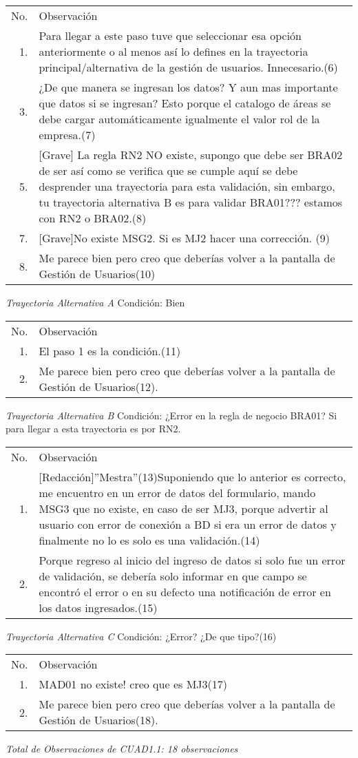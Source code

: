 \documentclass[10pt,spanish]{article}
\providecommand{\tabularnewline}{\\}
\begin{document}
\begin{longtable}{rp{8cm}}
No.  & Observación\tabularnewline
1.  & Para llegar a este paso tuve que seleccionar esa opción anteriormente o al menos así lo defines en la trayectoria principal/alternativa de la gestión de usuarios. Innecesario.(6)\tabularnewline
3.  & ¿De que manera se ingresan los datos? Y aun mas importante que datos si se ingresan? Esto porque el catalogo de áreas se debe cargar automáticamente igualmente el valor rol de la empresa.(7)\tabularnewline
5. & [Grave] La regla RN2 NO existe, supongo que debe ser BRA02 de ser así como se verifica que se cumple aquí se debe desprender una trayectoria para esta validación, sin embargo, tu trayectoria alternativa B es para validar BRA01??? estamos con RN2 o BRA02.(8)\tabularnewline
7. & [Grave]No existe MSG2. Si es MJ2 hacer una corrección. (9)\tabularnewline
8. & Me parece bien pero creo que deberías volver a la pantalla de Gestión de Usuarios(10)\tabularnewline

\end{longtable}

\textit{Trayectoria Alternativa A}
Condición: Bien
\begin{longtable}{rp{8cm}}
No.  & Observación\tabularnewline
1.  & El paso 1 es la condición.(11)\tabularnewline
2.  & Me parece bien pero creo que deberías volver a la pantalla de Gestión de Usuarios(12).\tabularnewline
\end{longtable}

\textit{Trayectoria Alternativa B}
Condición: ¿Error en la regla de negocio BRA01? Si para llegar a esta trayectoria es por RN2.
\begin{longtable}{rp{8cm}}
No.  & Observación\tabularnewline
1.  & [Redacción]''Mestra''(13)\newline
[Grave]Suponiendo que lo anterior es correcto, me encuentro en un error de datos del formulario, mando MSG3 que no existe, en caso de ser MJ3, porque advertir al usuario con error de conexión a BD si era un error de datos y finalmente no lo es solo es una validación.(14)
\tabularnewline
2.  & Porque regreso al inicio del ingreso de datos si solo fue un error de validación, se debería solo informar en que campo se encontró el error o en su defecto una notificación de error en los datos ingresados.(15)\tabularnewline
\end{longtable}

\textit{Trayectoria Alternativa C}
Condición: ¿Error? ¿De que tipo?(16)
\begin{longtable}{rp{8cm}}
No.  & Observación\tabularnewline
1.  & MAD01 no existe! creo que es MJ3(17)
\tabularnewline
2.  & Me parece bien pero creo que deberías volver a la pantalla de Gestión de Usuarios(18).\tabularnewline
\end{longtable}
\textit{Total de Observaciones de CUAD1.1: 18 observaciones}
\end{document}
